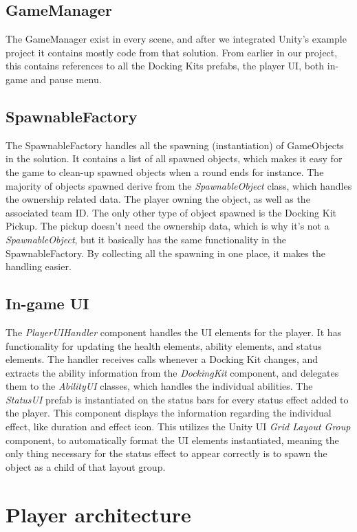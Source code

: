 \subsection{GameManager}
The GameManager exist in every scene, and after we integrated Unity's example project it contains mostly code from that solution. From earlier in our project, this contains references to all the Docking Kits prefabs, the player UI, both in-game and pause menu.

\subsection{SpawnableFactory}
The SpawnableFactory handles all the spawning (instantiation) of GameObjects in the solution. It contains a list of all spawned objects, which makes it easy for the game to clean-up spawned objects when a round ends for instance. The majority of objects spawned derive from the \emph{SpawnableObject} class, which handles the ownership related data. The player owning the object, as well as the associated team ID. The only other type of object spawned is the Docking Kit Pickup. The pickup doesn't need the ownership data, which is why it's not a \emph{SpawnableObject}, but it basically has the same functionality in the SpawnableFactory. By collecting all the spawning in one place, it makes the handling easier.

\subsection{In-game UI}
The \emph{PlayerUIHandler} component handles the UI elements for the player. It has functionality for updating the health elements, ability elements, and status elements. The handler receives calls whenever a Docking Kit changes, and extracts the ability information from the \emph{DockingKit} component, and delegates them to the \emph{AbilityUI} classes, which handles the individual abilities. The \emph{StatusUI} prefab is instantiated on the status bars for every status effect added to the player. This component displays the information regarding the individual effect, like duration and effect icon. This utilizes the Unity UI \emph{Grid Layout Group} component, to automatically format the UI elements instantiated, meaning the only thing necessary for the status effect to appear correctly is to spawn the object as a child of that layout group.

\section{Player architecture}


